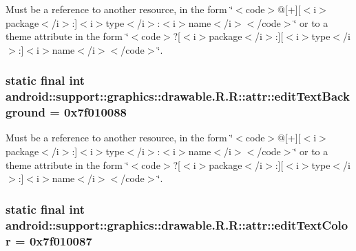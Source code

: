 Must be a reference to another resource, in the form \char`\"{}$<$code$>$@\mbox{[}+\mbox{]}\mbox{[}$<$i$>$package$<$/i$>$:\mbox{]}$<$i$>$type$<$/i$>$:$<$i$>$name$<$/i$>$$<$/code$>$\char`\"{} or to a theme attribute in the form \char`\"{}$<$code$>$?\mbox{[}$<$i$>$package$<$/i$>$:\mbox{]}\mbox{[}$<$i$>$type$<$/i$>$:\mbox{]}$<$i$>$name$<$/i$>$$<$/code$>$\char`\"{}. \hypertarget{classandroid_1_1support_1_1graphics_1_1drawable_1_1_r_1_1attr_a72b113fafacba3df3d3dcd5f2f5f7d5}{
\subsubsection[{editTextBackground}]{\setlength{\rightskip}{0pt plus 5cm}static final int android::support::graphics::drawable.R.R::attr::editTextBackground = 0x7f010088}}
\label{classandroid_1_1support_1_1graphics_1_1drawable_1_1_r_1_1attr_a72b113fafacba3df3d3dcd5f2f5f7d5}


Must be a reference to another resource, in the form \char`\"{}$<$code$>$@\mbox{[}+\mbox{]}\mbox{[}$<$i$>$package$<$/i$>$:\mbox{]}$<$i$>$type$<$/i$>$:$<$i$>$name$<$/i$>$$<$/code$>$\char`\"{} or to a theme attribute in the form \char`\"{}$<$code$>$?\mbox{[}$<$i$>$package$<$/i$>$:\mbox{]}\mbox{[}$<$i$>$type$<$/i$>$:\mbox{]}$<$i$>$name$<$/i$>$$<$/code$>$\char`\"{}. \hypertarget{classandroid_1_1support_1_1graphics_1_1drawable_1_1_r_1_1attr_b44f5d38e2c21f1802026a90712c8b11}{
\subsubsection[{editTextColor}]{\setlength{\rightskip}{0pt plus 5cm}static final int android::support::graphics::drawable.R.R::attr::editTextColor = 0x7f010087}}
\label{classandroid_1_1support_1_1graphics_1_1drawable_1_1_r_1_1attr_b44f5d38e2c21f1802026a90712c8b11}


